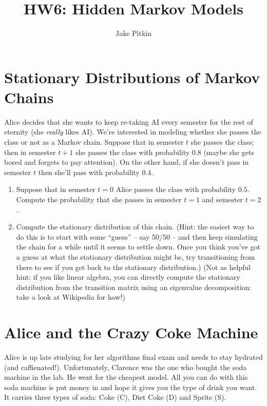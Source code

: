 \documentclass[fleqn]{hermans-hw}
\title{HW6: Hidden Markov Models}
\institute{University of Utah}
\author{Jake Pitkin}
\begin{document}
\maketitle
\section{Stationary Distributions of Markov Chains}

Alice decides that she wants to keep re-taking AI every semester for
the rest of eternity (she \emph{really} likes AI).  We're interested
in modeling whether she passes the class or not as a Markov chain.
Suppose that in semester $t$ she passes the class; then in semester
$t+1$ she passes the class with probability $0.8$ (maybe she gets
bored and forgets to pay attention).  On the other hand, if she
doesn't pass in semester $t$ then she'll pass with probability $0.4$.

\begin{enumerate}
\item Suppose that in semester $t=0$ Alice passes the class with
  probability $0.5$.  Compute the probability that she passes in
  semester $t=1$ and semester $t=2$.

\item Compute the stationary distribution of this chain.  (Hint: the
  easiest way to do this is to start with some ``guess'' -- say 50/50
  -- and then keep simulating the chain for a while until it seems to
  settle down.  Once you think you've got a guess at what the
  stationary distribution might be, try transitioning from there to
  see if you get back to the stationary distribution.)  (Not as
  helpful hint: if you like linear algebra, you can directly compute
  the stationary distribution from the transition matrix using an
  eigenvalue decomposition: take a look at Wikipedia for how!)
\end{enumerate}
\vspace{-0.5cm}
\section{Alice and the Crazy Coke Machine}
\vspace{-0.5cm}
Alice is up late studying for her algorithms final exam and needs to
stay hydrated (and caffienated!).  Unfortunately, Clarence was the one
who bought the soda machine in the lab.  He went for the cheapest
model.  All you can do with this soda machine is put money in and hope
it gives you the type of drink you want.  It carries three types of
soda: Coke (C), Diet Coke (D) and Sprite (S).
\end{document}
